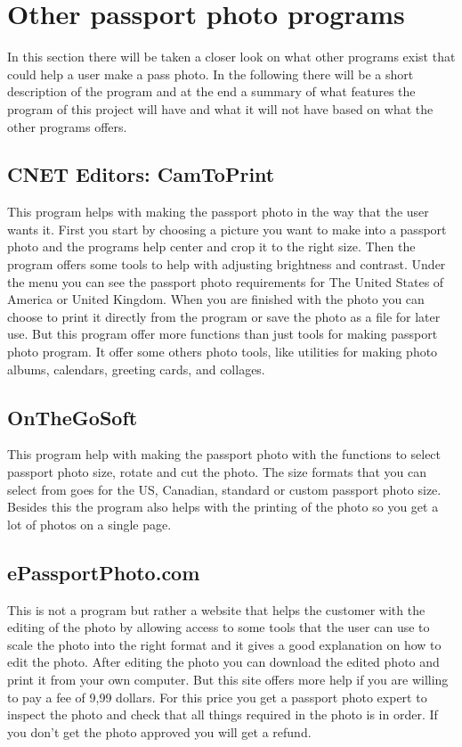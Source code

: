 

\section{Other passport photo programs}
In this section there will be taken a closer look on what other programs exist that could help a user make a pass photo. In the following there will be a short description of the program and at the end a summary of what features the program of this project will have and what it will not have based on what the other programs offers.

\subsection{CNET Editors: CamToPrint}
This program helps with making the passport photo in the way that the user wants it. First you start by choosing a picture you want to make into a passport photo and the programs help center and crop it to the right size. Then the program offers some tools to help with adjusting brightness and contrast. Under the menu you can see the passport photo requirements for The United States of America or United Kingdom. When you are finished with the photo you can choose to print it directly from the program or save the photo as a file for later use.
But this program offer more functions than just tools for making passport photo program. It offer some others photo tools, like utilities for making photo albums, calendars, greeting cards, and collages.\citep{pass_soft_c_net}
\newline


\subsection{OnTheGoSoft}
This program help with making the passport photo with the functions to select passport photo size, rotate and cut the photo. The size formats that you can select from goes for the US, Canadian, standard or custom passport photo size.
Besides this the program also helps with the printing of the photo so you get a lot of photos on a single page.\citep{on_the_go}
\newline

\subsection{ePassportPhoto.com}
This is not a program but rather a website that helps the customer with the editing of the photo by allowing access to some tools that the user can use to scale the photo into the right format and it gives a good explanation on how to edit the photo. After editing the photo you can download the edited photo and print it from your own computer.
But this site offers more help if you are willing to pay a fee of 9,99 dollars. For this price you get a passport photo expert to inspect the photo and check that all things required in the photo is in order. If you don't get the photo approved you will get a refund.\citep{ePass}
\newline


